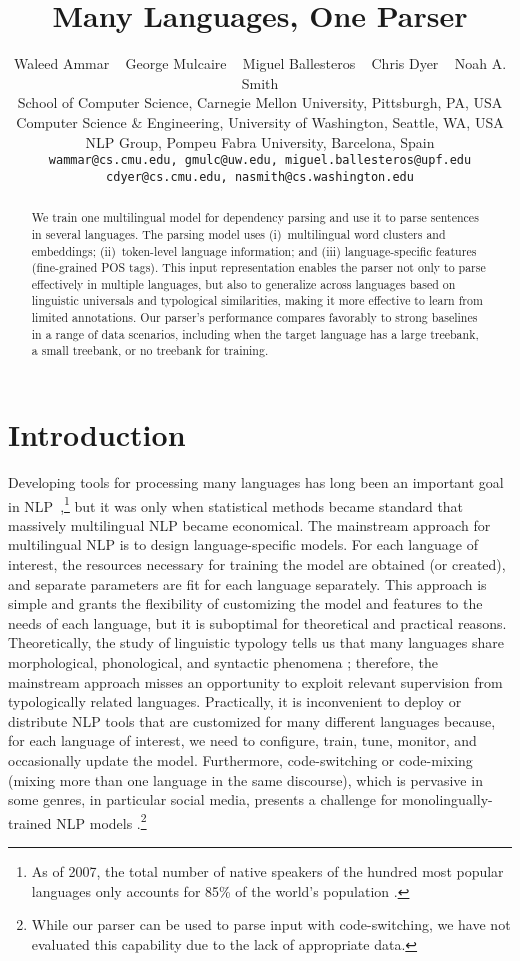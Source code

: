 \documentclass[11pt]{article}
\title{Many Languages, One Parser}
\author{Waleed Ammar ~ George Mulcaire ~ Miguel Ballesteros ~ Chris Dyer ~ Noah A. Smith\\
School of Computer Science, Carnegie Mellon University, Pittsburgh, PA, USA \\
Computer Science \& Engineering, University of Washington, Seattle, WA, USA\\
NLP Group, Pompeu Fabra University, Barcelona, Spain \\
{\tt wammar@cs.cmu.edu, gmulc@uw.edu, miguel.ballesteros@upf.edu} \\ {\tt cdyer@cs.cmu.edu, nasmith@cs.washington.edu}
}
\date{}
\begin{document}
\maketitle
\begin{abstract}
We train one multilingual model for dependency parsing and use it to parse sentences in several languages.
The parsing model uses (i)~multilingual word clusters and embeddings; (ii)~token-level language information; and (iii) language-specific features (fine-grained POS tags). This input representation enables the parser not only to parse effectively in multiple languages, but also to generalize across languages based on linguistic universals and typological similarities, making it more effective to learn from limited annotations.
Our parser's performance compares favorably to strong baselines in a range of data scenarios, including when the target language has a large treebank, a small treebank, or no treebank for training.
\end{abstract}

\section{Introduction}
\label{sec:introduction}

Developing tools for processing many languages has long been an important goal in NLP~\cite{rosner:88,heid:89},\footnote{As of 2007, the total number of native speakers of the hundred most popular languages only accounts for 85\% of the world's population \cite{native:07}.}
but it was only when statistical methods became standard that massively multilingual NLP became economical.
The mainstream approach for multilingual NLP is to design language-specific  models.
For each language of interest, the resources necessary for training the model are obtained (or created), and separate parameters are fit for each language separately.
This approach is simple and grants the flexibility of customizing the model and features to the needs of each language, but it is suboptimal for theoretical and practical reasons.
Theoretically, the study of linguistic typology tells us that many languages share morphological, phonological, and syntactic phenomena \cite{bender:11}; therefore, the mainstream approach misses an opportunity to exploit relevant supervision from typologically related languages.
Practically, it is inconvenient to deploy or distribute NLP tools that are customized for many different languages because, for each language of interest, we need to configure, train, tune, monitor, and occasionally update the model.
Furthermore, code-switching or code-mixing (mixing more than one language in the same discourse), which is pervasive in some genres, in particular social media, presents a challenge for monolingually-trained NLP models \cite{barman:14}.\footnote{While our parser can be used to parse input with code-switching, we have not evaluated this capability due to the lack of appropriate data.}
\end{document}

